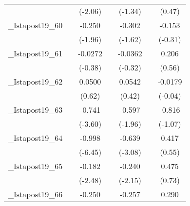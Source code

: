 {\begin{tabular}{l*{6}{c}}
            &                     &     (-2.06)         &                     &     (-1.34)         &                     &      (0.47)         \\
[1em]
\_Istapost19\_60&                     &      -0.250         &                     &      -0.302         &                     &      -0.153         \\
            &                     &     (-1.96)         &                     &     (-1.62)         &                     &     (-0.31)         \\
[1em]
\_Istapost19\_61&                     &     -0.0272         &                     &     -0.0362         &                     &       0.206         \\
            &                     &     (-0.38)         &                     &     (-0.32)         &                     &      (0.56)         \\
[1em]
\_Istapost19\_62&                     &      0.0500         &                     &      0.0542         &                     &     -0.0179         \\
            &                     &      (0.62)         &                     &      (0.42)         &                     &     (-0.04)         \\
[1em]
\_Istapost19\_63&                     &      -0.741\sym{**} &                     &      -0.597         &                     &      -0.816         \\
            &                     &     (-3.60)         &                     &     (-1.96)         &                     &     (-1.07)         \\
[1em]
\_Istapost19\_64&                     &      -0.998\sym{***}&                     &      -0.639\sym{**} &                     &       0.417         \\
            &                     &     (-6.45)         &                     &     (-3.08)         &                     &      (0.55)         \\
[1em]
\_Istapost19\_65&                     &      -0.182\sym{*}  &                     &      -0.240\sym{*}  &                     &       0.475         \\
            &                     &     (-2.48)         &                     &     (-2.15)         &                     &      (0.73)         \\
[1em]
\_Istapost19\_66&                     &      -0.250\sym{**} &                     &      -0.257         &                     &       0.290         \\

\end{tabular}}
